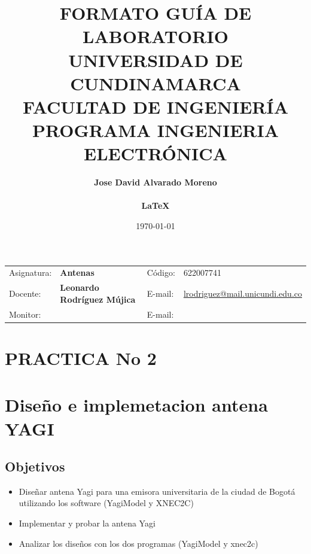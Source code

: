 \documentclass[onecolumn]{article}
\title{\textbf{FORMATO GUÍA DE LABORATORIO \\ UNIVERSIDAD DE CUNDINAMARCA \\ FACULTAD DE INGENIERÍA \\ PROGRAMA INGENIERIA ELECTRÓNICA}}
\author{\textbf{Jose David Alvarado Moreno} \\ \\ \huge{\textbf{\LaTeX}}}
\date{\today}
\makeatletter
\newcommand{\profesor}{Leonardo Rodríguez Mújica}
\newcommand{\correo}{lrodriguez@mail.unicundi.edu.co}
\newcommand{\nucleotematico}{Antenas}
\newcommand{\codigo}{622007741}
\newcommand{\monitor}{}
\newcommand{\cormon}{}
\newcommand{\marco}[2]
{
{\fboxsep 10pt
    \begin{framed}

\section{#1}
#2
\end{framed}
}
}
\newcommand{\objetivos}[1] { \marco{Objetivos}{#1} }
\makeatother
\begin{document}
\pagestyle{fancy}


\begin{center}
\begin{tabular}{|l l|l l|}
\hline
\multirow{2}{*}{Asignatura:} &\multirow{2}{*}{\textbf{\nucleotematico}}  & \multirow{2}{*}{Código:}  & \multirow{2}{*}{\codigo}  \\
                             &                                         &                          &                    \\ \hline
\multirow{2}{*}{Docente:}    &\multirow{2}{*}{\textbf{\profesor}}   & \multirow{2}{*}{E-mail:} & \multirow{2}{*}{\href{mailto:\correo}{\correo}}  \\
                             &                                         &                          &                     \\ \hline
\multirow{2}{*}{Monitor:}    &\multirow{2}{*}{\textbf{\monitor}} & \multirow{2}{*}{E-mail:} & \multirow{2}{*}{\href{mailto:\cormon}{\cormon}}   \\
                             &\hspace{6cm}                             &                          & \hspace{6cm}        \\ \hline
\end{tabular}
\end{center}

\begin{center}
\section*{PRACTICA No 2}

\section*{Diseño e implemetacion antena YAGI}

\end{center}

\objetivos{

\begin{itemize}
\item  Diseñar antena Yagi para una emisora universitaria de la
    ciudad de Bogotá utilizando los software (YagiModel y XNEC2C)
\item  Implementar y probar la antena Yagi
\item Analizar los  diseños con los dos programas (YagiModel y xnec2c)
\end{itemize}
}
\end{document}
